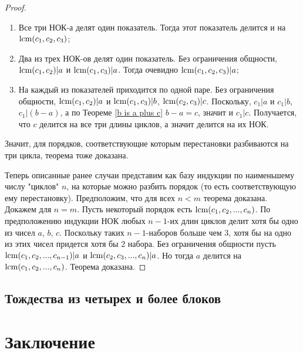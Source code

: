 \begin{proof}
		\begin{enumerate}
			\item Все три НОК-а делят один показатель. Тогда этот показатель делится и на $\operatorname{lcm}(c_1, c_2, c_3)$;
			\item Два из трех НОК-ов делят один показатель. Без ограничения общности, $\operatorname{lcm}(c_1, c_2) | a$ и $\operatorname{lcm}(c_1, c_3) | a$. Тогда очевидно $\operatorname{lcm}(c_1, c_2, c_3) | a$;
			\item На каждый из показателей приходится по одной паре. Без ограничения общности, $\operatorname{lcm}(c_1, c_2) | a$ и $\operatorname{lcm}(c_1, c_3) | b$, $\operatorname{lcm}(c_2, c_3) | c$. Поскольку, $c_1 | a$ и $c_1 | b$, $c_1 | (b-a)$, а по Теореме \ref{b is a plus c} $b-a = c$, значит и $c_1 | c$. Получается, что $c$ делится на все три длины циклов, а значит делится на их НОК. 
		\end{enumerate}
		Значит, для порядков, соответствующие которым перестановки разбиваются на три цикла, теорема тоже доказана.
		
		Теперь описанные ранее случаи представим как базу индукции по наименьшему числу "циклов" $n$, на которые можно разбить порядок (то есть соответствующую ему перестановку).
		Предположим, что для всех  $n < m$ теорема доказана. Докажем для $n=m$. Пусть некоторый порядок есть $\operatorname{lcm}(c_1, c_2, ..., c_n)$. По предположению индукции НОК любых $n-1$-их длин циклов делит хотя бы одно из чисел $a$, $b$, $c$. Поскольку таких $n-1$-наборов больше чем 3, хотя бы на одно из этих чисел придется хотя бы 2 набора. Без ограничения общности пусть $\operatorname{lcm}(c_1, c_2, ..., c_{n-1}) | a$ и $\operatorname{lcm}(c_2, c_3, ..., c_n) | a$. Но тогда $a$ делится на $\operatorname{lcm}(c_1, c_2, ..., c_n)$. Теорема доказана.
	\end{proof}

\subsection{Тождества из четырех и более блоков}

\newpage
\section{Заключение}